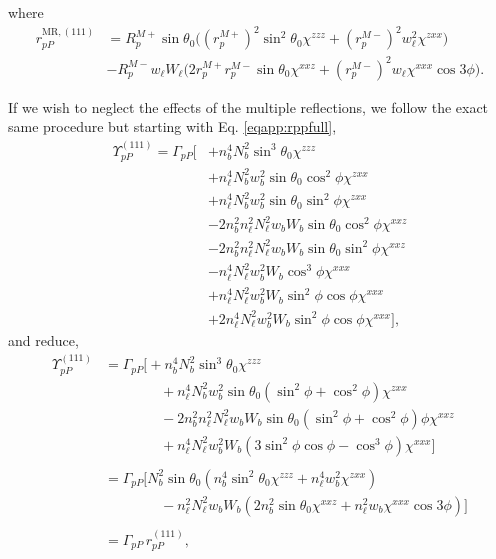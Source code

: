 where
\begin{equation}\label{eqapp:final-rpp.mr.111}
\begin{split}
r^{\mathrm{MR},(111)}_{pP} &= 
R^{M+}_{p}\sin\theta_{0}
\Big(
  \left(r^{M+}_{p}\right)^{2}\sin^{2}\theta_{0}\chi^{zzz}
+ \left(r^{M-}_{p}\right)^{2}w^{2}_{\ell}\chi^{zxx}
\Big)\\
&- R^{M-}_{p}w_{\ell}W_{\ell}
\Big(
  2r^{M+}_{p}r^{M-}_{p}\sin\theta_{0}\chi^{xxz}
+ \left(r^{M-}_{p}\right)^{2}w_{\ell}\chi^{xxx}\cos3\phi
\Big).
\end{split}
\end{equation}

If we wish to neglect the effects of the multiple reflections, we follow the
exact same procedure but starting with Eq. \eqref{eqapp:rppfull},
\begin{equation*}
\begin{split}
\Upsilon^{(111)}_{pP}
= \Gamma_{pP}
\big[
&+ n^{4}_{b}N^{2}_{b}\sin^{3}\theta_{0}\chi^{zzz}\\
&+ n^{4}_{\ell}N^{2}_{b}w^{2}_{b}\sin\theta_{0}\cos^{2}\phi\chi^{zxx}\\
&+ n^{4}_{\ell}N^{2}_{b}w^{2}_{b}\sin\theta_{0}\sin^{2}\phi\chi^{zxx}\\
&- 2n^{2}_{b}n^{2}_{\ell}N^{2}_{\ell}w_{b}W_{b}\sin\theta_{0}\cos^{2}\phi
  \chi^{xxz}\\
&- 2n^{2}_{b}n^{2}_{\ell}N^{2}_{\ell}w_{b}W_{b}\sin\theta_{0}\sin^{2}\phi
  \chi^{xxz}\\
&- n^{4}_{\ell}N^{2}_{\ell}w^{2}_{b}W_{b}\cos^{3}\phi\chi^{xxx}\\
&+ n^{4}_{\ell}N^{2}_{\ell}w^{2}_{b}W_{b}\sin^{2}\phi\cos\phi\chi^{xxx}\\
&+ 2n^{4}_{\ell}N^{2}_{\ell}w^{2}_{b}W_{b}\sin^{2}\phi\cos\phi\chi^{xxx}
\big],
\end{split}
\end{equation*}
and reduce,
\begin{equation*}
\begin{split}
\Upsilon^{(111)}_{pP} &=
\Gamma_{pP}
\big[
+ n^{4}_{b}N^{2}_{b}
   \sin^{3}\theta_{0}\chi^{zzz}\\
&\qquad\qquad+ n^{4}_{\ell}N^{2}_{b}w^{2}_{b}
   \sin\theta_{0}(\sin^{2}\phi + \cos^{2}\phi)\chi^{zxx}\\
&\qquad\qquad- 2n^{2}_{b}n^{2}_{\ell}N^{2}_{\ell}w_{b}W_{b}
   \sin\theta_{0}(\sin^{2}\phi + \cos^{2}\phi)\phi\chi^{xxz}\\
&\qquad\qquad+ n^{4}_{\ell}N^{2}_{\ell}w^{2}_{b}W_{b}
   (3\sin^{2}\phi\cos\phi - \cos^{3}\phi)\chi^{xxx}
\big]\\\\
&=
\Gamma_{pP}
\big[
N^{2}_{b}\sin\theta_{0}(n^{4}_{b}\sin^{2}\theta_{0}\chi^{zzz} 
+ n^{4}_{\ell}w^{2}_{b}\chi^{zxx})\\
&\qquad\qquad- n^{2}_{\ell}N^{2}_{\ell}w_{b}W_{b}(2n^{2}_{b}\sin\theta_{0}
\chi^{xxz} 
 + n^{2}_{\ell}w_{b}\chi^{xxx}\cos3\phi)
\big]\\\\
&= \Gamma_{pP}\,r^{(111)}_{pP},
\end{split}
\end{equation*}
